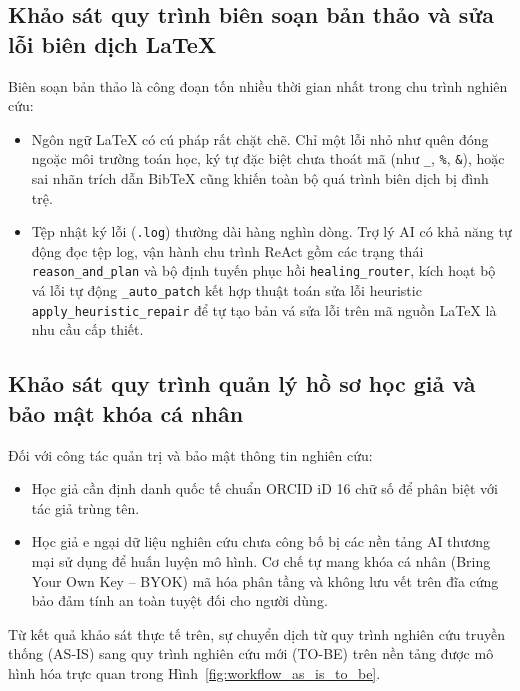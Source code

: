 \subsection{Khảo sát quy trình biên soạn bản thảo và sửa lỗi biên dịch LaTeX}
\label{subsec:khao_sat_bien_soan}
Biên soạn bản thảo là công đoạn tốn nhiều thời gian nhất trong chu trình nghiên cứu:
\begin{itemize}[noitemsep, topsep=2pt]
    \item Ngôn ngữ LaTeX có cú pháp rất chặt chẽ. Chỉ một lỗi nhỏ như quên đóng ngoặc môi trường toán học, ký tự đặc biệt chưa thoát mã (như \texttt{\_}, \texttt{\%}, \texttt{\&}), hoặc sai nhãn trích dẫn BibTeX cũng khiến toàn bộ quá trình biên dịch bị đình trệ.
    \item Tệp nhật ký lỗi (\texttt{.log}) thường dài hàng nghìn dòng. Trợ lý AI có khả năng tự động đọc tệp log, vận hành chu trình ReAct gồm các trạng thái \texttt{reason\_and\_plan} và bộ định tuyến phục hồi \texttt{healing\_router}, kích hoạt bộ vá lỗi tự động \texttt{\_auto\_patch} kết hợp thuật toán sửa lỗi heuristic \texttt{apply\_heuristic\_repair} để tự tạo bản vá sửa lỗi trên mã nguồn LaTeX là nhu cầu cấp thiết.
\end{itemize}


\subsection{Khảo sát quy trình quản lý hồ sơ học giả và bảo mật khóa cá nhân}
\label{subsec:khao_sat_ho_so}
Đối với công tác quản trị và bảo mật thông tin nghiên cứu:
\begin{itemize}[noitemsep, topsep=2pt]
    \item Học giả cần định danh quốc tế chuẩn ORCID iD 16 chữ số để phân biệt với tác giả trùng tên.
    \item Học giả e ngại dữ liệu nghiên cứu chưa công bố bị các nền tảng AI thương mại sử dụng để huấn luyện mô hình. Cơ chế tự mang khóa cá nhân (Bring Your Own Key -- BYOK) mã hóa phân tầng và không lưu vết trên đĩa cứng bảo đảm tính an toàn tuyệt đối cho người dùng.
\end{itemize}

Từ kết quả khảo sát thực tế trên, sự chuyển dịch từ quy trình nghiên cứu truyền thống (AS-IS) sang quy trình nghiên cứu mới (TO-BE) trên nền tảng \VS được mô hình hóa trực quan trong Hình~\ref{fig:workflow_as_is_to_be}.

